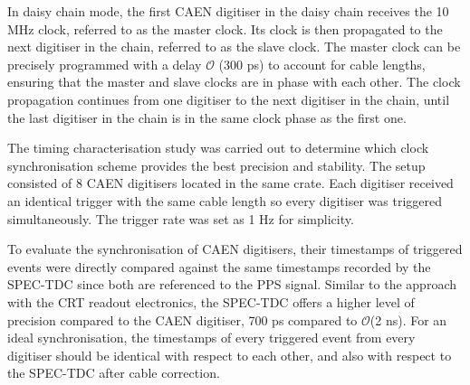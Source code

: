 In daisy chain mode, the first CAEN digitiser in the daisy chain receives the 10 MHz clock, referred to as the master clock.
Its clock is then propagated to the next digitiser in the chain, referred to as the slave clock.
The master clock can be precisely programmed with a delay $\mathcal{O}$ (300 ps) to account for cable lengths, ensuring that the master and slave clocks are in phase with each other.
The clock propagation continues from one digitiser to the next digitiser in the chain, until the last digitiser in the chain is in the same clock phase as the first one.  


The timing characterisation study was carried out to determine which clock synchronisation scheme provides the best precision and stability. 
The setup consisted of 8 CAEN digitisers located in the same crate. 
Each digitiser received an identical trigger with the same cable length so every digitiser was triggered simultaneously.
The trigger rate was set as 1 Hz for simplicity.

To evaluate the synchronisation of CAEN digitisers, their timestamps of triggered events were directly compared against the same timestamps recorded by the SPEC-TDC since both are referenced to the 
PPS signal.
Similar to the approach with the CRT readout electronics, the SPEC-TDC offers a higher level of precision compared to the CAEN digitiser, 700 ps compared to $\mathcal{O}$(2 ns). 
For an ideal synchronisation, the timestamps of every triggered event from every digitiser should be identical with respect to each other, and also with respect to the SPEC-TDC after cable correction.



